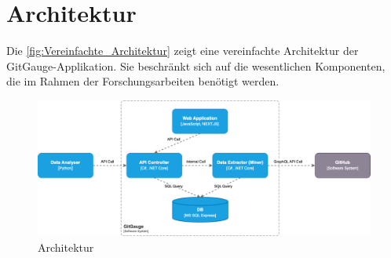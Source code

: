 \section{Architektur}
Die \autoref{fig:Vereinfachte_Architektur} zeigt eine vereinfachte Architektur der GitGauge-Applikation. Sie beschränkt sich auf die wesentlichen Komponenten, die im Rahmen der Forschungsarbeiten benötigt werden.  
\begin{figure}[htbp]
    \centering
        \includegraphics[width=\textwidth]{Figures/Vereinfachte_Architektur.png}
    \caption{Architektur}
    \label{fig:Vereinfachte_Architektur}
\end{figure}

